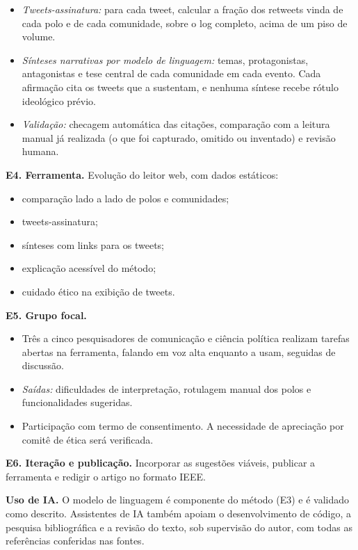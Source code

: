 \documentclass[12pt,a4paper,oneside]{article}
\begin{document}
\begin{itemize}
\item \emph{Tweets-assinatura:} para cada tweet, calcular a fração dos retweets vinda de cada polo e de cada comunidade, sobre o log completo, acima de um piso de volume.
\item \emph{Sínteses narrativas por modelo de linguagem:} temas, protagonistas, antagonistas e tese central de cada comunidade em cada evento. Cada afirmação cita os tweets que a sustentam, e nenhuma síntese recebe rótulo ideológico prévio.
\item \emph{Validação:} checagem automática das citações, comparação com a leitura manual já realizada (o que foi capturado, omitido ou inventado) e revisão humana.
\end{itemize}

\textbf{E4. Ferramenta.} Evolução do leitor web, com dados estáticos:

\begin{itemize}
\item comparação lado a lado de polos e comunidades;
\item tweets-assinatura;
\item sínteses com links para os tweets;
\item explicação acessível do método;
\item cuidado ético na exibição de tweets.
\end{itemize}

\textbf{E5. Grupo focal.}

\begin{itemize}
\item Três a cinco pesquisadores de comunicação e ciência política realizam tarefas abertas na ferramenta, falando em voz alta enquanto a usam, seguidas de discussão.
\item \emph{Saídas:} dificuldades de interpretação, rotulagem manual dos polos e funcionalidades sugeridas.
\item Participação com termo de consentimento. A necessidade de apreciação por comitê de ética será verificada.
\end{itemize}

\textbf{E6. Iteração e publicação.} Incorporar as sugestões viáveis, publicar a ferramenta e redigir o artigo no formato IEEE.

\textbf{Uso de IA.} O modelo de linguagem é componente do método (E3) e é validado como descrito. Assistentes de IA também apoiam o desenvolvimento de código, a pesquisa bibliográfica e a revisão do texto, sob supervisão do autor, com todas as referências conferidas nas fontes.
\end{document}
